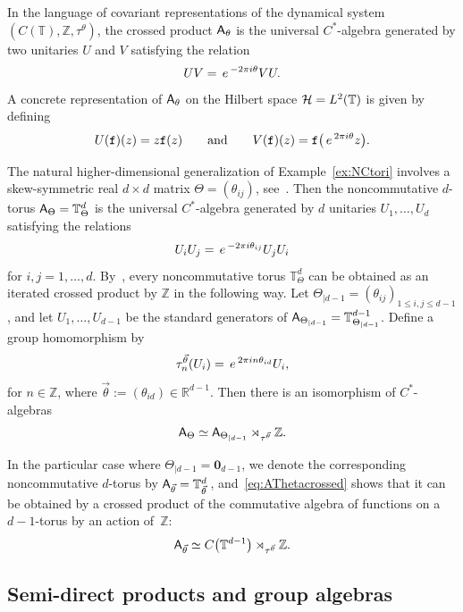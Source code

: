 \documentclass[11pt]{article}
\numberwithin{equation}{section}
\numberwithin{equation}{section}
\newcommand{\Z}{\zed}
\newcommand{\mbf}[1]{{\boldsymbol {#1} }}
\def\ii{{{\rm i}}}
\def\A{{\sf A}}
\newcommand{\Aut}{\operatorname{Aut}}
\newcommand{\R}{\real}
\newcommand{\zed}{{\mathbb Z}} %
\newcommand{\real}{{\mathbb R}} %
\newcommand{\torus}{{\mathbb T}} %
\def\hil{{\mathcal H}}
\def\e{{\,\rm e}\,}
\begin{document}
\begin{Example}
In the language of covariant representations of the dynamical system
$(C(\torus),\Z,\tau^\theta)$, the crossed product $\A_\theta$ is the
universal $C^*$-algebra generated by two unitaries $U$ and $V$
satisfying the relation~\cite[Proposition~2.56]{Williams2007}
\begin{gather}\label{eq:C*UV}
U V=\e^{-2\pi\ii \theta} V U .
\end{gather}
A concrete representation
of $\A_\theta$ on the Hilbert space $\hil = {\rm L}^2(\torus)$ is
given by defining
\[
U(\mathtt{f})(z)=z \mathtt{f}(z) \qquad \mbox{and} \qquad V(\mathtt{f})(z) =
\mathtt{f}\big(\e^{2\pi\ii\theta} z\big) .
\]
\end{Example}

\begin{Example}[{{\bf Noncommutative $\mbf{d}$-tori}}]
\label{ex:NCtorid}
The natural higher-dimensional generalization of
Example~\ref{ex:NCtori} involves a skew-symmetric real $d{\times}d$
matrix $\Theta=(\theta_{ij})$, see~\cite{Rieffel1990}. Then the noncommutative $d$-torus
$\A_\Theta=\torus_\Theta^d$ is the universal $C^*$-algebra generated
by $d$ unitaries $U_1,\dots,U_d$ satisfying the relations
\[
U_i U_j = \e^{-2\pi\ii\theta_{ij}} U_j U_i
\]
for $i,j=1,\dots,d$. By~\cite[Lemma~1.5]{Phillips2006}, every
noncommutative torus $\torus_\Theta^d$ can be obtained as an iterated
crossed product by $\Z$ in the following way. Let
$\Theta_{|d-1}=(\theta_{ij})_{1\leq i,j\leq d-1}$, and let
$U_1,\dots,U_{d-1}$ be the standard generators of
$\A_{\Theta_{|d-1}}=\torus^{d-1}_{\Theta_{|d-1}}$. Define a
group homomorphism
\smash{$\tau^{\vec\theta}\colon \Z\to\Aut(\A_{\Theta_{|d-1}})$} by
\[
\tau_n^{\vec\theta}(U_i) = \e^{2\pi\ii n \theta_{id}} U_i
 ,
\]
for $n\in\Z$, where $\vec\theta:=(\theta_{id})\in\R^{d-1}$.
Then there is an isomorphism of $C^*$-algebras
\begin{gather}\label{eq:AThetacrossed}
\A_\Theta\simeq\A_{\Theta_{|d-1}}
\rtimes_{\tau^{\vec\theta}} \Z .
\end{gather}

In the particular case where $\Theta_{|d-1}=\mbf 0_{d-1}$, we denote the
corresponding noncommutative $d$-torus by
$\A_{\vec\theta}=\torus_{\vec\theta}^d\,$, and~\eqref{eq:AThetacrossed}
shows that it can be obtained by a crossed product of the commutative
algebra of functions on a $d{-}1$-torus by an action of~$\Z$:
\[
\A_{\vec\theta} \simeq C\big(\torus^{d-1}\big)\rtimes_{\tau^{\vec\theta}}\Z .
\]
\end{Example}

\subsection{Semi-direct products and group algebras}\label{sec:semidirect}
\end{document}
